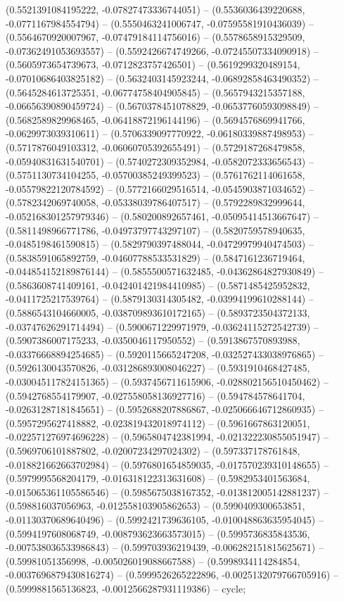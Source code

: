(0.5521391084195222, -0.07827473336744051) -- (0.5536036439220688, -0.0771167984554794) -- (0.5550463241006747, -0.07595581910436039) -- (0.5564670920007967, -0.07479184114756016) -- (0.5578658915329509, -0.07362491053693557) -- (0.5592426674749266, -0.07245507334090918) -- (0.5605973654739673, -0.0712823757426501) -- (0.5619299320489154, -0.07010686403825182) -- (0.5632403145923244, -0.06892858463490352) -- (0.5645284613725351, -0.06774758404905845) -- (0.5657943215357188, -0.06656390890459724) -- (0.5670378451078829, -0.06537760593098849) -- (0.5682589829968465, -0.06418872196144196) -- (0.5694576869941766, -0.0629973039310611) -- (0.5706339097770922, -0.06180339887498953) -- (0.5717876049103312, -0.06060705392655491) -- (0.5729187268479858, -0.05940831631540701) -- (0.5740272309352984, -0.0582072333656543) -- (0.5751130734104255, -0.05700385249399523) -- (0.5761762114061658, -0.05579822120784592) -- (0.5772166029516514, -0.0545903871034652) -- (0.5782342069740058, -0.05338039786407517) -- (0.5792289832999644, -0.052168301257979346) -- (0.580200892657461, -0.05095414513667647) -- (0.5811498966771786, -0.04973797743297107) -- (0.5820759578940635, -0.0485198461590815) -- (0.5829790397488044, -0.04729979940474503) -- (0.5838591065892759, -0.04607788533531829) -- (0.5847161236719464, -0.044854152189876144) -- (0.5855500571632485, -0.04362864827930849) -- (0.5863608741409161, -0.042401421984410985) -- (0.5871485425952832, -0.0411725217539764) -- (0.5879130314305482, -0.03994199610288144) -- (0.5886543104660005, -0.038709893610172165) -- (0.5893723504372133, -0.03747626291714494) -- (0.5900671229971979, -0.03624115272542739) -- (0.5907386007175233, -0.0350046117950552) -- (0.5913867570893988, -0.03376668894254685) -- (0.5920115665247208, -0.032527433038976865) -- (0.5926130043570826, -0.031286893008046227) -- (0.5931910468427485, -0.030045117824151365) -- (0.5937456711615906, -0.028802156510450462) -- (0.5942768554179907, -0.027558058136927716) -- (0.594784578641704, -0.02631287181845651) -- (0.5952688207886867, -0.025066646712860935) -- (0.5957295627418882, -0.023819432018974112) -- (0.5961667863120051, -0.022571276974696228) -- (0.5965804742381994, -0.021322230855051947) -- (0.5969706101887802, -0.02007234297024302) -- (0.597337178761848, -0.018821662663702984) -- (0.5976801654859035, -0.017570239310148655) -- (0.5979995568204179, -0.016318122313631608) -- (0.5982953401563684, -0.015065361105586546) -- (0.5985675038167352, -0.013812005142881237) -- (0.598816037056963, -0.012558103905862653) -- (0.5990409300653851, -0.01130370689640496) -- (0.5992421739636105, -0.010048863635954045) -- (0.5994197608068749, -0.008793623663573015) -- (0.5995736835843536, -0.007538036533986843) -- (0.599703936219439, -0.006282151815625671) -- (0.59981051356998, -0.005026019088667588) -- (0.5998934114284854, -0.0037696879430816274) -- (0.5999526265222896, -0.0025132079766705916) -- (0.5999881565136823, -0.0012566287931119386) -- cycle;
